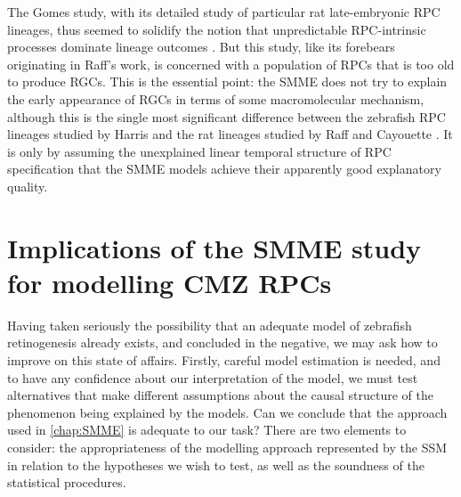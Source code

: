 \documentclass{ut-thesis}
\begin{document}
\begin{NoHyper}
The Gomes study, with its detailed study of particular rat late-embryonic RPC lineages, thus seemed to solidify the notion that unpredictable RPC-intrinsic processes dominate lineage outcomes \cite{Gomes2011}. But this study, like its forebears originating in Raff's work, is concerned with a population of RPCs that is too old to produce RGCs. This is the essential point: the SMME does not try to explain the early appearance of RGCs in terms of some macromolecular mechanism, although this is the single most significant difference between the zebrafish RPC lineages studied by Harris and the rat lineages studied by Raff and Cayouette \cite{Cayouette2003, Gomes2011}. It is only by assuming the unexplained linear temporal structure of RPC specification that the SMME models achieve their apparently good explanatory quality.

\section{Implications of the SMME study for modelling CMZ RPCs}
Having taken seriously the possibility that an adequate model of zebrafish retinogenesis already exists, and concluded in the negative, we may ask how to improve on this state of affairs. Firstly, careful model estimation is needed, and to have any confidence about our interpretation of the model, we must test alternatives that make different assumptions about the causal structure of the phenomenon being explained by the models. Can we conclude that the approach used in \autoref{chap:SMME} is adequate to our task? There are two elements to consider: the appropriateness of the modelling approach represented by the SSM in relation to the hypotheses we wish to test, as well as the soundness of the statistical procedures.


\end{NoHyper}
\end{document}

